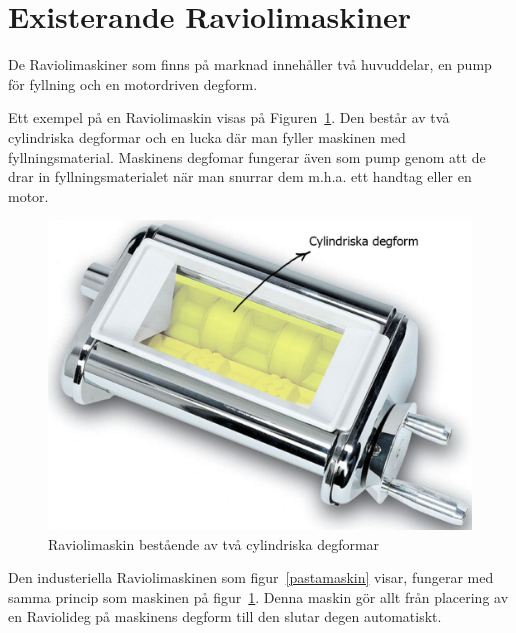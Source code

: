 \section{Existerande Raviolimaskiner}
De Raviolimaskiner som finns på marknad innehåller två huvuddelar, en pump för fyllning och en motordriven degform. 

Ett exempel på en Raviolimaskin visas på Figuren~\ref{raviolihemma}. Den består av två cylindriska degformar och en lucka där man fyller maskinen med fyllningsmaterial. Maskinens degfomar fungerar även som pump genom att de drar in fyllningsmaterialet när man snurrar dem m.h.a. ett handtag eller en motor.
 	\begin{figure}[h]
 		\begin{center}
 			\includegraphics[scale=0.4]{images/ravioli_machine_comment.jpg}
 			\caption{Raviolimaskin bestående av två cylindriska degformar~\cite{raviolimaskinbutik} }
 			\label{raviolihemma}	
 		\end{center}
 	\end{figure}
 
Den industeriella Raviolimaskinen som figur~\ref{pastamaskin} visar, fungerar med samma princip som maskinen på figur~\ref{raviolihemma}. Denna maskin gör allt från placering av en Raviolideg på maskinens degform till den slutar degen automatiskt.

